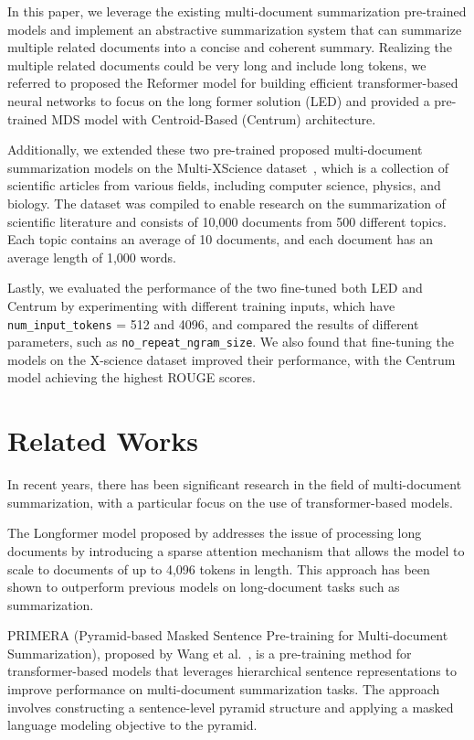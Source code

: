\documentclass[12pt, twocolumn]{article}
\numberwithin{equation}{section}
\begin{document}
In this paper, we leverage the existing multi-document summarization pre-trained models and implement an abstractive summarization system that can summarize multiple related documents into a concise and coherent summary. Realizing the multiple related documents could be very long and include long tokens, we referred to \cite{beltagy2020longformer} proposed the Reformer model for building efficient transformer-based neural networks to focus on the long former solution (LED) and \cite{puduppully2022multidocument} provided a pre-trained MDS model with Centroid-Based (Centrum) architecture.

Additionally, we extended these two pre-trained proposed multi-document summarization models on the Multi-XScience dataset~\cite{lu-etal-2020-multi-xscience}, which is a collection of scientific articles from various fields, including computer science, physics, and biology. The dataset was compiled to enable research on the summarization of scientific literature and consists of 10,000 documents from 500 different topics. Each topic contains an average of 10 documents, and each document has an average length of 1,000 words.

Lastly, we evaluated the performance of the two fine-tuned both LED and Centrum by experimenting with different training inputs, which have \texttt{num\_input\_tokens} = 512 and 4096, and compared the results of different parameters, such as \texttt{no\_repeat\_ngram\_size}. We also found that fine-tuning the models on the X-science dataset improved their performance, with the Centrum model achieving the highest ROUGE scores.

\section{Related Works}
\label{sec:relatedworks}

In recent years, there has been significant research in the field of multi-document summarization, with a particular focus on the use of transformer-based models.

The Longformer model proposed by \cite{beltagy2020longformer} addresses the issue of processing long documents by introducing a sparse attention mechanism that allows the model to scale to documents of up to 4,096 tokens in length. This approach has been shown to outperform previous models on long-document tasks such as summarization.

PRIMERA (Pyramid-based Masked Sentence Pre-training for Multi-document Summarization), proposed by Wang et al.~\cite{xiao2022primera}, is a pre-training method for transformer-based models that leverages hierarchical sentence representations to improve performance on multi-document summarization tasks. The approach involves constructing a sentence-level pyramid structure and applying a masked language modeling objective to the pyramid.
\end{document}
